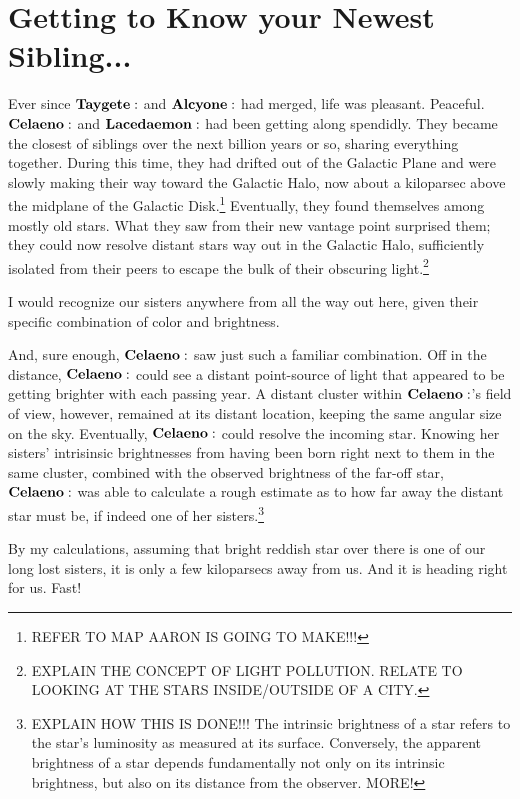 \documentclass[main.tex]{subfiles}
\begin{document}
\section{Getting to Know your Newest Sibling...}

Ever since $\Taygete$ and $\Alcyone$ had merged, life was pleasant.  Peaceful.  $\Celaeno$ and $\Lacedaemon$ had been getting along spendidly.  They became the closest of siblings over the next billion years or so, sharing everything together.  During this time, they had drifted out of the Galactic Plane and were slowly making their way toward the Galactic Halo, now about a kiloparsec above the midplane of the Galactic Disk.\footnote{REFER TO MAP AARON IS GOING TO MAKE!!!} 
Eventually, they found themselves among mostly old stars. What they saw from their new vantage point surprised them; they could now resolve distant stars way out in the Galactic Halo, sufficiently isolated from their peers to escape the bulk of their obscuring light.\footnote{EXPLAIN THE CONCEPT OF LIGHT POLLUTION.  RELATE TO LOOKING AT THE STARS INSIDE/OUTSIDE OF A CITY.}  

\Celaeno I would recognize our sisters anywhere from all the way out here, given their specific combination of color and brightness.  

And, sure enough, $\Celaeno$ saw just such a familiar combination.  Off in the distance, $\Celaeno$ could see a distant point-source of light that appeared to be getting brighter with each passing year.  A distant cluster within $\Celaeno$'s field of view, however, remained at its distant location, keeping the same angular size on the sky.  Eventually, $\Celaeno$ could resolve the incoming star.  Knowing her sisters' intrisinsic brightnesses from having been born right next to them in the same cluster, combined with the observed brightness of the far-off star, $\Celaeno$ was able to calculate a rough estimate as to how far away the distant star must be, if indeed one of her sisters.\footnote{EXPLAIN HOW THIS IS DONE!!!  The intrinsic brightness of a star refers to the star's luminosity as measured at its surface.  Conversely, the apparent brightness of a star depends fundamentally not only on its intrinsic brightness, but also on its distance from the observer. MORE!}

\Celaeno  By my calculations, assuming that bright reddish star over there is one of our long lost sisters, it is only a few kiloparsecs away from us.  And it is heading right for us.  Fast!  
\end{document}
